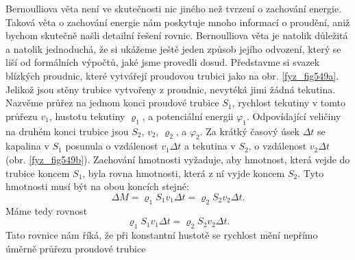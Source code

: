 {    Bernoulliova věta není ve skutečnosti nic jiného než tvrzení o zachování energie. Taková věta o 
    zachování energie nám poskytuje mnoho informací o proudění, aniž bychom skutečně našli detailní 
    řešení rovnic. Bernoulliova věta je natolik důležitá a natolik jednoduchá, že si ukážeme ještě 
    jeden způsob jejího odvození, který se liší od formálních výpočtů, jaké jsme provedli dosud. 
    Představme si svazek blízkých proudnic, které vytvářejí proudovou trubici jako na obr. 
    \ref{fyz_fig549a}. Jelikož jsou stěny trubice vytvořeny z proudnic, nevytéká jimi žádná 
    tekutina. Nazvěme průřez na jednom konci proudové trubice \(S_1\), rychlost tekutiny v tomto 
    průřezu \(v_1\), hustotu tekutiny \(\varrho_1\), a potenciální energii  \(\varphi_1\). 
    Odpovídající veličiny na druhém konci trubice jsou \(S_2\), \(v_2\), \(\varrho_2\), a 
    \(\varphi_2\). Za krátký časový úsek \(\Delta t\) se kapalina v \(S_1\) posunula o vzdálenost 
    \(v_1\Delta t\) a tekutina v \(S_2\), o vzdálenost \(v_2\Delta t\) (obr. \ref{fyz_fig549b}). 
    Zachování hmotnosti vyžaduje, aby hmotnost, která vejde do trubice koncem \(S_1\), byla rovna 
    hmotnosti, která z ní vyjde koncem \(S_2\). Tyto hmotnosti musí být na obou koncích stejné:
    \begin{equation*}
      \Delta M = \varrho_1S_1v_1\Delta t = \varrho_2S_2v_2\Delta t.
    \end{equation*}
    Máme tedy rovnost
    \begin{equation}\label{fyz:eq561}
      \varrho_1S_1v_1\Delta t = \varrho_2S_2v_2\Delta t.
    \end{equation}
    Tato rovnice nám říká, že při konstantní hustotě se rychlost mění nepřímo úměrně průřezu 
    proudové trubice
    
}
